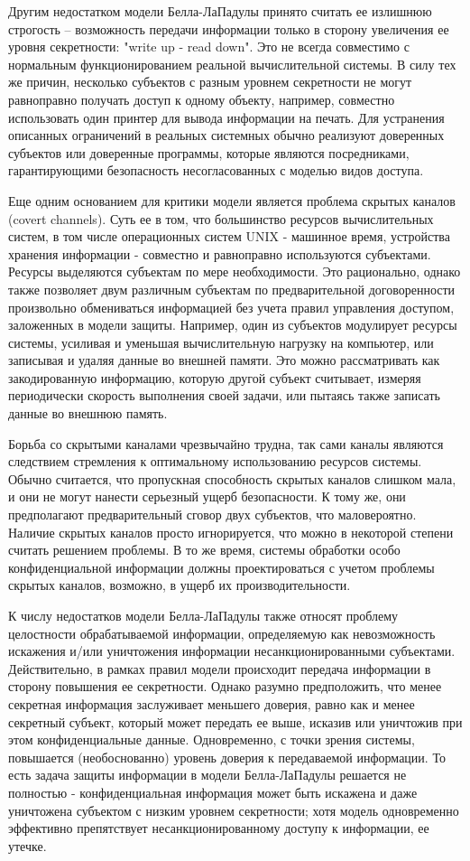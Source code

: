 Другим недостатком модели Белла-ЛаПадулы принято считать ее излишнюю строгость -- возможность передачи информации только в сторону увеличения ее уровня секретности: "write up - read down". Это не всегда совместимо с нормальным функционированием реальной вычислительной системы. В силу тех же причин, несколько субъектов с разным уровнем секретности не могут равноправно получать доступ к одному объекту, например, совместно использовать один принтер для вывода информации на печать. Для устранения описанных ограничений в реальных системных обычно реализуют доверенных субъектов или доверенные программы, которые являются посредниками, гарантирующими безопасность несогласованных с моделью видов доступа. 

Еще одним основанием для критики модели является проблема скрытых каналов (covert channels). Суть ее в том, что большинство ресурсов вычислительных систем, в том числе операционных систем UNIX - машинное время, устройства хранения информации - совместно и равноправно используются субъектами. Ресурсы выделяются субъектам по мере необходимости. Это рационально, однако также позволяет двум различным субъектам по предварительной договоренности произвольно обмениваться информацией без учета правил управления доступом, заложенных в модели защиты. Например, один из субъектов модулирует ресурсы системы, усиливая и уменьшая вычислительную нагрузку на компьютер, или записывая и удаляя данные во внешней памяти. Это можно рассматривать как закодированную информацию, которую другой субъект считывает, измеряя периодически скорость выполнения своей задачи, или пытаясь также записать данные во внешнюю память. 

Борьба со скрытыми каналами чрезвычайно трудна, так сами каналы являются следствием стремления к оптимальному использованию ресурсов системы. Обычно считается, что пропускная способность скрытых каналов слишком мала, и они не могут нанести серьезный ущерб безопасности. К тому же, они предполагают предварительный сговор двух субъектов, что маловероятно. Наличие скрытых каналов просто игнорируется, что можно в некоторой степени считать решением проблемы. В то же время, системы обработки особо конфиденциальной информации должны проектироваться с учетом проблемы скрытых каналов, возможно, в ущерб их производительности. 

К числу недостатков модели Белла-ЛаПадулы также относят проблему целостности обрабатываемой информации, определяемую как невозможность искажения и/или уничтожения информации несанкционированными субъектами. Действительно, в рамках правил модели происходит передача информации в сторону повышения ее секретности. Однако разумно предположить, что менее секретная информация заслуживает меньшего доверия, равно как и менее секретный субъект, который может передать ее выше, исказив или уничтожив при этом конфиденциальные данные. Одновременно, с точки зрения системы, повышается (необоснованно) уровень доверия к передаваемой информации. То есть задача защиты информации в модели Белла-ЛаПадулы решается не полностью - конфиденциальная информация может быть искажена и даже уничтожена субъектом с низким уровнем секретности; хотя модель одновременно эффективно препятствует несанкционированному доступу к информации, ее утечке. 

